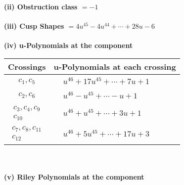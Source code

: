 \documentclass[1p]{elsarticle_modified}
\theoremstyle{definition}
\begin{document}
\flushleft \textbf{(ii) Obstruction class $= -1$}\\~\\
\flushleft \textbf{(iii) Cusp Shapes $= 4 u^{45}-4 u^{44}+\cdots+28 u-6$}\\~\\
\newpage\renewcommand{\arraystretch}{1}
\flushleft \textbf{(iv) u-Polynomials at the component}\newline \\
\begin{tabular}{m{50pt}|m{274pt}}
Crossings & \hspace{64pt}u-Polynomials at each crossing \\
\hline $$\begin{aligned}c_{1},c_{5}\end{aligned}$$&$\begin{aligned}
&u^{46}+17 u^{45}+\cdots+7 u+1
\end{aligned}$\\
\hline $$\begin{aligned}c_{2},c_{6}\end{aligned}$$&$\begin{aligned}
&u^{46}- u^{45}+\cdots- u+1
\end{aligned}$\\
\hline $$\begin{aligned}c_{3},c_{4},c_{9}\\c_{10}\end{aligned}$$&$\begin{aligned}
&u^{46}+u^{45}+\cdots+3 u+1
\end{aligned}$\\
\hline $$\begin{aligned}c_{7},c_{8},c_{11}\\c_{12}\end{aligned}$$&$\begin{aligned}
&u^{46}+5 u^{45}+\cdots+17 u+3
\end{aligned}$\\
\hline
\end{tabular}\\~\\
\newpage\renewcommand{\arraystretch}{1}
\flushleft \textbf{(v) Riley Polynomials at the component}\newline \\
\end{document}
